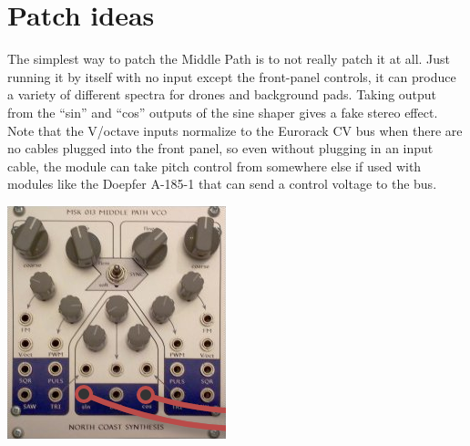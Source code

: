 
%
%
%
%
%
%

\chapter{Patch ideas}

The simplest way to patch the Middle Path is to not really patch it at
all.  Just running it by itself with no input except the front-panel
controls, it can produce a variety of different spectra for drones and
background pads.  Taking output from the ``sin'' and ``cos'' outputs of the
sine shaper gives a fake stereo effect.  Note that the V/octave inputs
normalize to the Eurorack CV bus when there are no cables plugged into the
front panel, so even without plugging in an input cable, the module can take
pitch control from somewhere else if used with modules like the Doepfer
A-185-1 that can send a control voltage to the bus.

\nopagebreak\noindent
{\hspace*{\fill}\includegraphics[scale=0.4]{mp-patch1.png}\hspace*{\fill}\par} 

